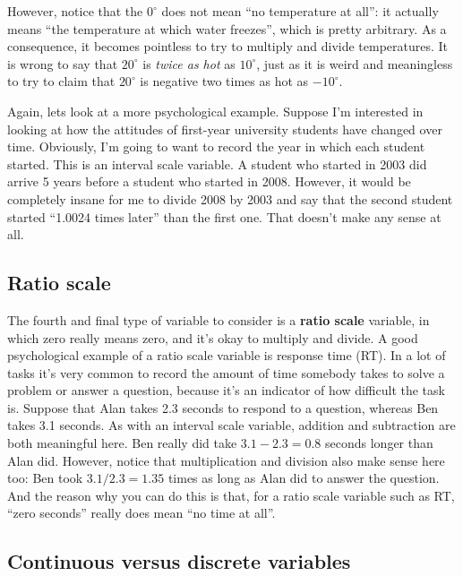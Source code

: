 \documentclass[
]{book}
\begin{document}
However, notice that the \(0^\circ\) does not mean ``no temperature at all'': it actually means ``the temperature at which water freezes'', which is pretty arbitrary. As a consequence, it becomes pointless to try to multiply and divide temperatures. It is wrong to say that \(20^\circ\) is {\emph{twice as hot}} as \(10^\circ\), just as it is weird and meaningless to try to claim that \(20^\circ\) is negative two times as hot as \(-10^\circ\).

Again, lets look at a more psychological example. Suppose I'm interested in looking at how the attitudes of first-year university students have changed over time. Obviously, I'm going to want to record the year in which each student started. This is an interval scale variable. A student who started in 2003 did arrive 5 years before a student who started in 2008. However, it would be completely insane for me to divide 2008 by 2003 and say that the second student started ``1.0024 times later'' than the first one. That doesn't make any sense at all.

\subsection{Ratio scale}\label{ratio-scale}

The fourth and final type of variable to consider is a \textbf{ratio scale} variable, in which zero really means zero, and it's okay to multiply and divide. A good psychological example of a ratio scale variable is response time (RT). In a lot of tasks it's very common to record the amount of time somebody takes to solve a problem or answer a question, because it's an indicator of how difficult the task is. Suppose that Alan takes 2.3 seconds to respond to a question, whereas Ben takes 3.1 seconds. As with an interval scale variable, addition and subtraction are both meaningful here. Ben really did take \(3.1 - 2.3 = 0.8\) seconds longer than Alan did. However, notice that multiplication and division also make sense here too: Ben took \(3.1 / 2.3 = 1.35\) times as long as Alan did to answer the question. And the reason why you can do this is that, for a ratio scale variable such as RT, ``zero seconds'' really does mean ``no time at all''.

\subsection{Continuous versus discrete variables}\label{continuous-versus-discrete-variables}
\end{document}

